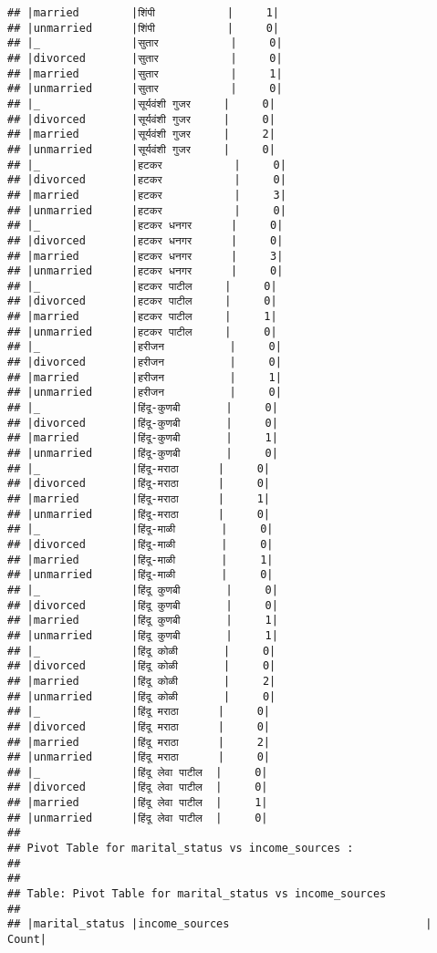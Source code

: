 \documentclass[
]{article}
\begin{document}
\begin{verbatim}
## |married        |शिंपी           |     1|
## |unmarried      |शिंपी           |     0|
## |_              |सुतार           |     0|
## |divorced       |सुतार           |     0|
## |married        |सुतार           |     1|
## |unmarried      |सुतार           |     0|
## |_              |सूर्यवंशी गुजर     |     0|
## |divorced       |सूर्यवंशी गुजर     |     0|
## |married        |सूर्यवंशी गुजर     |     2|
## |unmarried      |सूर्यवंशी गुजर     |     0|
## |_              |हटकर           |     0|
## |divorced       |हटकर           |     0|
## |married        |हटकर           |     3|
## |unmarried      |हटकर           |     0|
## |_              |हटकर धनगर      |     0|
## |divorced       |हटकर धनगर      |     0|
## |married        |हटकर धनगर      |     3|
## |unmarried      |हटकर धनगर      |     0|
## |_              |हटकर पाटील     |     0|
## |divorced       |हटकर पाटील     |     0|
## |married        |हटकर पाटील     |     1|
## |unmarried      |हटकर पाटील     |     0|
## |_              |हरीजन          |     0|
## |divorced       |हरीजन          |     0|
## |married        |हरीजन          |     1|
## |unmarried      |हरीजन          |     0|
## |_              |हिंदू-कुणबी       |     0|
## |divorced       |हिंदू-कुणबी       |     0|
## |married        |हिंदू-कुणबी       |     1|
## |unmarried      |हिंदू-कुणबी       |     0|
## |_              |हिंदू-मराठा      |     0|
## |divorced       |हिंदू-मराठा      |     0|
## |married        |हिंदू-मराठा      |     1|
## |unmarried      |हिंदू-मराठा      |     0|
## |_              |हिंदू-माळी       |     0|
## |divorced       |हिंदू-माळी       |     0|
## |married        |हिंदू-माळी       |     1|
## |unmarried      |हिंदू-माळी       |     0|
## |_              |हिंदू कुणबी       |     0|
## |divorced       |हिंदू कुणबी       |     0|
## |married        |हिंदू कुणबी       |     1|
## |unmarried      |हिंदू कुणबी       |     1|
## |_              |हिंदू कोळी       |     0|
## |divorced       |हिंदू कोळी       |     0|
## |married        |हिंदू कोळी       |     2|
## |unmarried      |हिंदू कोळी       |     0|
## |_              |हिंदू मराठा      |     0|
## |divorced       |हिंदू मराठा      |     0|
## |married        |हिंदू मराठा      |     2|
## |unmarried      |हिंदू मराठा      |     0|
## |_              |हिंदू लेवा पाटील  |     0|
## |divorced       |हिंदू लेवा पाटील  |     0|
## |married        |हिंदू लेवा पाटील  |     1|
## |unmarried      |हिंदू लेवा पाटील  |     0|
## 
## Pivot Table for marital_status vs income_sources :
## 
## 
## Table: Pivot Table for marital_status vs income_sources
## 
## |marital_status |income_sources                              | Count|

\end{verbatim}
\end{document}
